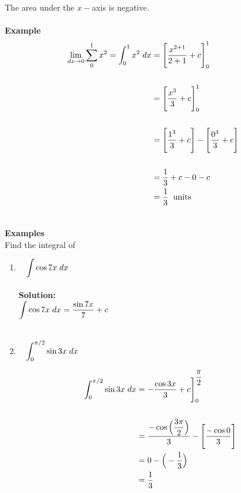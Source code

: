 \documentclass[11pt,a4paper]{article}
\begin{document}
The area under the $x-$axis is negative.\\\\




\textbf{Example}
\begin{align*}
\lim\limits_{dx \rightarrow 0}\sum^1_0 x^2 = \int^1_0 x^2\hspace{0.1cm}dx & = \Bigg[ \dfrac{x^{2 + 1}}{2  + 1} + c\Bigg]^1_0\\\\
& = \Bigg[\dfrac{x^3}{3} + c\Bigg]^1_0\\\\
& = \Bigg[\dfrac{1^3}{3} + c\Bigg] - \Bigg[\dfrac{0^3}{3} + c\Bigg]\\\\
& = \dfrac{1}{3} + c - 0 - c\\\
& = \dfrac{1}{3}\hspace{0.2cm}\text{units}\\\\
\end{align*}










\textbf{Examples}\\

Find the integral of 

\begin{enumerate}
\item $\hspace{0.3cm}\displaystyle{\int \cos 7x\hspace{0.1cm}dx}$\\\\

\textbf{Solution:}\\

$\displaystyle{\int \cos 7x\hspace{0.1cm}dx = \dfrac{\sin 7x}{7} + c}$\\\\


\item $\hspace{0.3cm}\displaystyle{\int^{\pi /2}_0 \sin 3x\hspace{0.1cm}dx}$


\begin{align*}
\int^{\pi /2}_0 \sin 3x\hspace{0.1cm}dx & = -\dfrac{\cos 3x}{3} + c\Bigg]^{\dfrac{\pi}{2}}_0\\\\
& = \dfrac{-\cos \Big(\dfrac{3\pi}{2}\Big)}{3} - \Bigg[ \dfrac{-\cos 0}{3}\Bigg]\\\
& = 0 - \Big(-\dfrac{1}{3}\Big)\\
& = \dfrac{1}{3}\\\\
\end{align*}
\end{enumerate}
\end{document}
